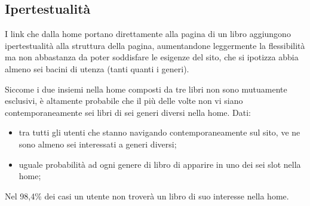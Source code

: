 \subsection{Ipertestualità}
I link che dalla home portano direttamente alla pagina di un libro aggiungono
ipertestualità alla struttura della pagina, aumentandone leggermente la
flessibilità ma non abbastanza da poter soddisfare le esigenze del sito, che
si ipotizza abbia almeno sei bacini di utenza (tanti quanti i generi).

Siccome i due insiemi nella home composti da tre libri non sono mutuamente
esclusivi, è altamente probabile che il più delle volte non vi siano
contemporaneamente sei libri di sei generi diversi nella home.
Dati:
\begin{itemize}
\item tra tutti gli utenti che stanno navigando contemporaneamente sul sito,
ve ne sono almeno sei interessati a generi diversi;
\item uguale probabilità ad ogni genere di libro di apparire in uno dei sei slot nella home;
\end{itemize}
Nel 98,4\% dei casi un utente non troverà un libro di suo interesse nella home.
